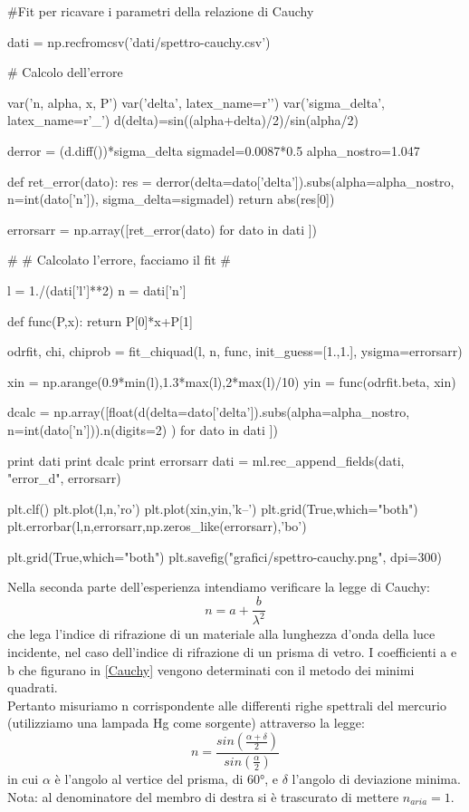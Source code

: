 \begin{sagesilent}
#Fit per ricavare i parametri della relazione di Cauchy

dati = np.recfromcsv('dati/spettro-cauchy.csv')

# Calcolo dell'errore

var('n, alpha, x, P')
var('delta', latex_name=r'\delta')
var('sigma_delta', latex_name=r'\sigma_{\delta}')
d(delta)=sin((alpha+delta)/2)/sin(alpha/2)

derror = (d.diff())*sigma_delta
sigmadel=0.0087*0.5
alpha_nostro=1.047

def ret_error(dato):
  res = derror(delta=dato['delta']).subs(alpha=alpha_nostro, n=int(dato['n']),
                    sigma_delta=sigmadel)
  return abs(res[0])
  
errorsarr = np.array([ret_error(dato) for dato in dati ])

#
# Calcolato l'errore, facciamo il fit
#

l = 1./(dati['l']**2)
n = dati['n']

def func(P,x):
    return P[0]*x+P[1]

odrfit, chi, chiprob = fit_chiquad(l, n, func, init_guess=[1.,1.], ysigma=errorsarr)

xin = np.arange(0.9*min(l),1.3*max(l),2*max(l)/10)
yin = func(odrfit.beta, xin)

dcalc = np.array([float(d(delta=dato['delta']).subs(alpha=alpha_nostro, n=int(dato['n'])).n(digits=2) ) for dato in dati ])

print dati
print dcalc
print errorsarr
dati = ml.rec_append_fields(dati, "error_d", errorsarr)

plt.clf()
plt.plot(l,n,'ro')
plt.plot(xin,yin,'k--')
plt.grid(True,which="both")
plt.errorbar(l,n,errorsarr,np.zeros_like(errorsarr),'bo')

plt.grid(True,which="both")
plt.savefig("grafici/spettro-cauchy.png", dpi=300)

\end{sagesilent}

Nella seconda parte dell'esperienza intendiamo verificare la legge di Cauchy:
\begin{equation}
n = a + \frac{b}{\lambda^2}
\label{Cauchy}
\end{equation}
che lega l'indice di rifrazione di un materiale alla lunghezza d'onda della luce incidente, nel caso dell'indice di rifrazione di un prisma di vetro.
I coefficienti a e b che figurano in \ref{Cauchy} vengono determinati con il metodo dei minimi quadrati. \\
Pertanto misuriamo n corrispondente alle differenti righe spettrali del mercurio (utilizziamo una lampada Hg come sorgente) attraverso la legge:
\begin{equation}
n = \frac{sin(\frac{\alpha + \delta}{2})}{sin(\frac{\alpha}{2})}
\label{n}
\end{equation}
in cui $\alpha$ è l'angolo al vertice del prisma, di $60°$, e $\delta$ l'angolo di deviazione minima. Nota: al denominatore del membro di destra si è trascurato di mettere $n_{aria}=1$.\\

